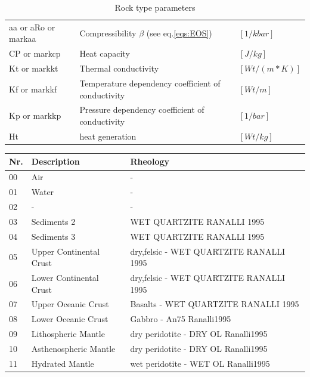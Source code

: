 \begin{table}[H]
\begin{tabular}{l p{8cm} l}
aa or aRo or markaa & Compressibility $\beta$ (see eq.\ref{eqs:EOS}) & $[1/kbar]$\\ 
CP or markcp & Heat capacity  & $[J/kg]$ \\ 
Kt or markkt & Thermal conductivity & $[Wt/(m*K)]$ \\ 
Kf or markkf & Temperature dependency coefficient of conductivity & $[Wt/m]$ \\ 
Kp or markkp & Pressure dependency coefficient of conductivity & $[1/bar]$ \\ 
Ht & heat generation & $[Wt/kg]$\\ 
\bottomrule
\end{tabular}
\caption{Rock type parameters}
\label{tbl:rock_type_parameters}
\end{table}


\begin{table}[H]
\small
\centering
\begin{tabular}{l p{6cm} p{8cm}}
\toprule
Nr. & Description & Rheology\\
\midrule
\rowcolor[rgb]{1.0000    1.0000    1.0000}
00 & Air & -\\
\rowcolor[rgb]{0.5059    0.9961    0.7882}
01 & Water & -\\
\rowcolor[rgb]{1.0000    1.0000    1.0000}
02 & - &  - \\
\rowcolor[rgb]{0.6824    0.3412         0}
03 & Sediments 2 & WET QUARTZITE RANALLI 1995 \\
\rowcolor[rgb]{1.0000    0.5020         0}
04 & Sediments 3 & WET QUARTZITE RANALLI 1995 \\
\rowcolor[rgb]{0.7529    0.7529    0.7529}
05 & Upper Continental Crust & dry,felsic - WET QUARTZITE RANALLI 1995 \\
\rowcolor[rgb]{0.5020    0.5020    0.5020}
06 & Lower Continental Crust & dry,felsic - WET QUARTZITE RANALLI 1995 \\
\rowcolor[rgb]{ 0    0.5020         0}
07 & Upper Oceanic Crust & Basalts - WET QUARTZITE RANALLI 1995 \\
\rowcolor[rgb]{0    0.8431         0}
08 & Lower Oceanic Crust & Gabbro - An75 Ranalli1995 \\
\rowcolor[rgb]{0         0    0.7177}
09 & Lithospheric Mantle & dry peridotite - DRY OL Ranalli1995 \\
\rowcolor[rgb]{ 0.3216    0.2000    0.6745}
10 & Asthenospheric Mantle & dry peridotite - DRY OL Ranalli1995 \\
\rowcolor[rgb]{0.5412    0.7216    0.9922}
11 & Hydrated Mantle & wet peridotite - WET OL Ranalli1995 \\

\end{tabular}
\end{table}
